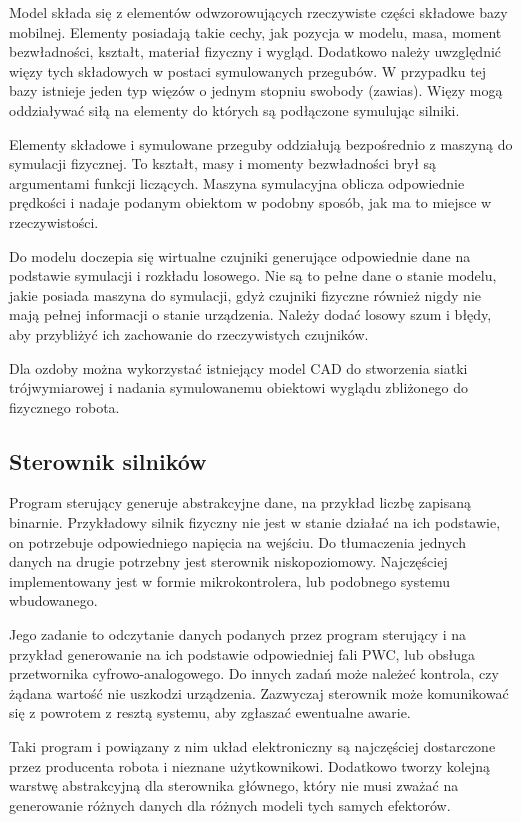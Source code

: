 	Model składa się z elementów odwzorowujących rzeczywiste części składowe bazy mobilnej.
	Elementy posiadają takie cechy, jak pozycja w modelu, masa, moment bezwładności, kształt, materiał fizyczny i wygląd.
	Dodatkowo należy uwzględnić więzy tych składowych w postaci symulowanych przegubów.
	W przypadku tej bazy istnieje jeden typ więzów o jednym stopniu swobody (zawias).
	Więzy mogą oddziaływać siłą na elementy do których są podłączone symulując silniki.

	Elementy składowe i symulowane przeguby oddziałują bezpośrednio z maszyną do symulacji fizycznej. 
	To kształt, masy i momenty bezwładności brył są argumentami funkcji liczących.
	Maszyna symulacyjna oblicza odpowiednie prędkości i nadaje podanym obiektom w podobny sposób, jak ma to miejsce w rzeczywistości.

	Do modelu doczepia się wirtualne czujniki generujące odpowiednie dane na podstawie symulacji i rozkładu losowego.
	Nie są to pełne dane o stanie modelu, jakie posiada maszyna do symulacji, gdyż czujniki fizyczne również nigdy nie mają pełnej informacji o stanie urządzenia.
	Należy dodać losowy szum i błędy, aby przybliżyć ich zachowanie do rzeczywistych czujników.

	Dla ozdoby można wykorzystać istniejący model CAD do stworzenia siatki trójwymiarowej i nadania symulowanemu obiektowi wyglądu zbliżonego do fizycznego robota.

	\subsection{Sterownik silników}
	Program sterujący generuje abstrakcyjne dane, na przykład liczbę zapisaną binarnie.
	Przykładowy silnik fizyczny nie jest w stanie działać na ich podstawie, on potrzebuje odpowiedniego napięcia na wejściu.
	Do tłumaczenia jednych danych na drugie potrzebny jest sterownik niskopoziomowy.
	Najczęściej implementowany jest w formie mikrokontrolera, lub podobnego systemu wbudowanego.

	Jego zadanie to odczytanie danych podanych przez program sterujący i na przykład generowanie na ich podstawie odpowiedniej fali PWC, lub obsługa przetwornika cyfrowo-analogowego.
	Do innych zadań może należeć kontrola, czy żądana wartość nie uszkodzi urządzenia.
	Zazwyczaj sterownik może komunikować się z powrotem z resztą systemu, aby zgłaszać ewentualne awarie.

	Taki program i powiązany z nim układ elektroniczny są najczęściej dostarczone przez producenta robota i nieznane użytkownikowi.
	Dodatkowo tworzy kolejną warstwę abstrakcyjną dla sterownika głównego, który nie musi zważać na generowanie różnych danych dla różnych modeli tych samych efektorów.
	
